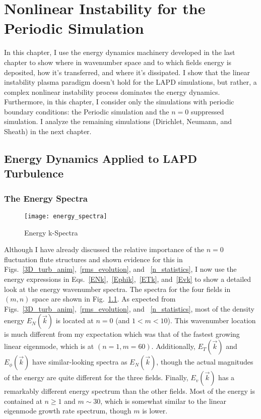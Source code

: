 \chapter{Nonlinear Instability for the Periodic Simulation}
\label{c_nlin_periodic}

In this chapter, I use the energy dynamics machinery developed in the last chapter to show where in wavenumber space and to which fields energy is deposited, how it's transferred,
and where it's dissipated. I show that the linear instability plasma paradigm doesn't hold for the LAPD simulations, but rather, a complex nonlinear instability process dominates
the energy dynamics.
Furthermore, in this chapter, I consider only the simulations with periodic boundary conditions: the Periodic simulation and the $n=0$ suppressed simulation. I analyze the remaining simulations
(Dirichlet, Neumann, and Sheath) in the next chapter.

\section{Energy Dynamics Applied to LAPD Turbulence}

\subsection{The Energy Spectra}
\label{ss_en_spec}

\begin{figure}[!ht]
\centerline{\texttt{[image: energy\_spectra]}}
\caption{Energy k-Spectra}
\label{energy_spectra}
\end{figure}

Although I have already discussed the relative importance of the $n=0$ fluctuation flute structures and shown evidence for this in Figs.~\ref{3D_turb_anim},~\ref{rms_evolution}, and
~\ref{n_statistics}, I now use the energy expressions in Eqs.~\ref{ENk},~\ref{Ephik},~\ref{ETk}, and~\ref{Evk} to show a detailed look at the energy
wavenumber spectra. The spectra for the four fields in $(m,n)$ space are shown in Fig.~\ref{energy_spectra}. As expected from Figs.~\ref{3D_turb_anim},~\ref{rms_evolution}, and
~\ref{n_statistics}, most of the density energy $E_N(\vec{k})$ is located at $n=0$ (and $1 < m < 10$). This wavenumber location is much different from my expectation which was
that of the fastest growing linear eigenmode, which is at $(n = 1, m = 60)$. Additionally, $E_T(\vec{k})$ and $E_\phi(\vec{k})$ have similar-looking spectra as $E_N(\vec{k})$, though
the actual magnitudes of the energy are quite different for the three fields. Finally, $E_v(\vec{k})$ has a remarkably different energy spectrum than the other fields. Most of
the energy is contained at $n \ge 1$ and $m \sim 30$, which is somewhat similar to the linear eigenmode growth rate spectrum, though $m$ is lower.

